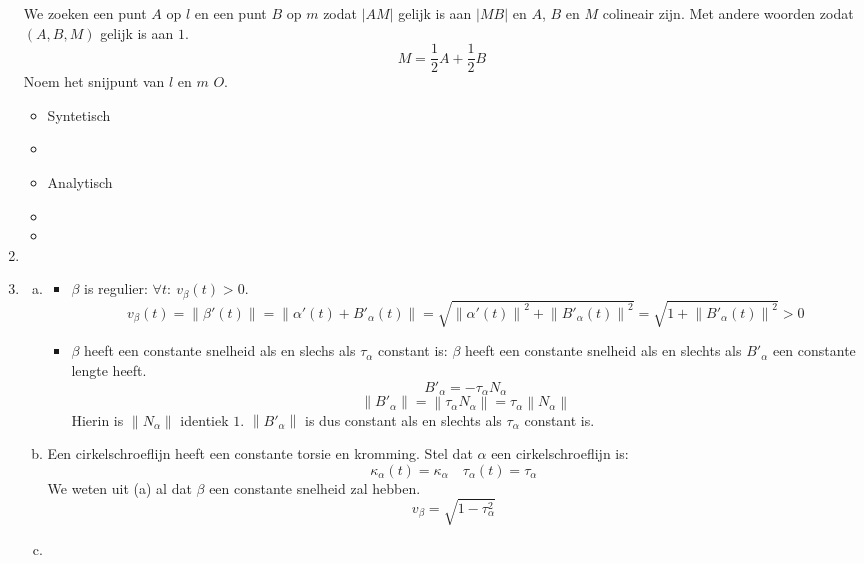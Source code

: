 \documentclass[main.tex]{subfiles}
\begin{document}
\begin{enumerate}
\begin{figure}[H]
  \end{figure}
  We zoeken een punt $A$ op $l$ en een punt $B$ op $m$ zodat $|AM|$ gelijk is aan $|MB|$ en $A$, $B$ en $M$ colineair zijn.
  Met andere woorden zodat $(A,B,M)$ gelijk is aan $1$.
  \[ M = \frac{1}{2}A + \frac{1}{2}B \]
  Noem het snijpunt van $l$ en $m$ $O$.
  \begin{itemize}
  \item Syntetisch\\
  \item \TODO{}
  \item Analytisch\\
  \item \TODO{}
  \item \TODO{}
  \end{itemize}
\item \TODO{}
\item 
  \begin{enumerate}[(a)]
  \item 
    \begin{itemize}
    \item $\beta$ is regulier: $\forall t:\ v_{\beta}(t) > 0$.
      \[ v_{\beta}(t) = \left\| \beta'(t) \right\| = \left\|\alpha'(t) + B'_{\alpha}(t) \right\| = \sqrt{\left\| \alpha'(t)\right\|^{2} + \left\| B'_{\alpha}(t) \right\|^{2}} = \sqrt{1 + \left\| B'_{\alpha}(t) \right\|^{2}} > 0\]
    \item $\beta$ heeft een constante snelheid als en slechs als $\tau_{\alpha}$ constant is:
      $\beta$ heeft een constante snelheid als en slechts als $B'_{\alpha}$ een constante lengte heeft.
      \[ B'_{\alpha} = -\tau_{\alpha}N_{\alpha} \]
      \[ \left\|B'_{\alpha}\right\| = \left\|\tau_{\alpha}N_{\alpha}\right\| = \tau_{\alpha} \left\|N_{\alpha}\right\| \]
      Hierin is $\left\|N_{\alpha}\right\|$ identiek $1$. $\left\|B'_{\alpha}\right\|$ is dus constant als en slechts als $\tau_{\alpha}$ constant is.
    \end{itemize}
  \item 
    Een cirkelschroeflijn heeft een constante torsie en kromming.
    Stel dat $\alpha$ een cirkelschroeflijn is:
    \[ \kappa_{\alpha}(t) = \kappa_{\alpha} \quad \tau_{\alpha}(t) = \tau_{\alpha} \]
    We weten uit (a) al dat $\beta$ een constante snelheid zal hebben.
    \[ v_{\beta} = \sqrt{1-\tau_{\alpha}^{2}}\]
\TODO{}
\item 
\TODO{}
  \end{enumerate}
\end{enumerate}
\end{document}
